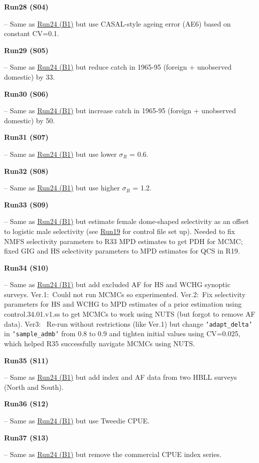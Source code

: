\hypertarget{R28}{\textbf{Run28 (S04)}} -- Same as \hyperlink{R24}{Run24 (B1)} but use CASAL-style ageing error (AE6) based on constant CV=0.1.

\hypertarget{R29}{\textbf{Run29 (S05)}} -- Same as \hyperlink{R24}{Run24 (B1)} but reduce catch in 1965-95 (foreign + unobserved domestic) by 33\pc.

\hypertarget{R30}{\textbf{Run30 (S06)}} -- Same as \hyperlink{R24}{Run24 (B1)} but increase catch in 1965-95 (foreign + unobserved domestic) by 50\pc.

\hypertarget{R31}{\textbf{Run31 (S07)}} -- Same as \hyperlink{R24}{Run24 (B1)} but use lower $\sigma_R$ = 0.6.

\hypertarget{R32}{\textbf{Run32 (S08)}} -- Same as \hyperlink{R24}{Run24 (B1)} but use higher $\sigma_R$ = 1.2.

\hypertarget{R33}{\textbf{Run33 (S09)}} -- Same as \hyperlink{R24}{Run24 (B1)} but estimate female dome-shaped selectivity as an offset to logistic male selectivity (see \hyperlink{R19}{Run19} for control file set up). Needed to fix NMFS selectivity parameters to R33 MPD estimates to get PDH for MCMC; fixed GIG and HS selectivity parameters to MPD estimates for QCS in R19.

\hypertarget{R34}{\textbf{Run34 (S10)}} -- Same as \hyperlink{R24}{Run24 (B1)} but add excluded AF for HS and WCHG synoptic surveys. Ver.1:~Could not run MCMCs so experimented. Ver.2:~Fix selectivity parameters for HS and WCHG to MPD estimates of a prior estimation using control.34.01.v1.ss to get MCMCs to work using NUTS (but forgot to remove AF data). Ver3:~ Re-run without restrictions (like Ver.1) but change \texttt{`adapt\_delta'} in \texttt{`sample\_admb'} from 0.8 to 0.9 and tighten initial values using CV=0.025, which helped R35 successfully navigate MCMCs using NUTS.

\hypertarget{R35}{\textbf{Run35 (S11)}} -- Same as \hyperlink{R24}{Run24 (B1)} but add index and AF data from two HBLL surveys (North and South).

\hypertarget{R36}{\textbf{Run36 (S12)}} -- Same as \hyperlink{R24}{Run24 (B1)} but use Tweedie CPUE.

\hypertarget{R37}{\textbf{Run37 (S13)}} -- Same as \hyperlink{R24}{Run24 (B1)} but remove the commercial CPUE index series.

